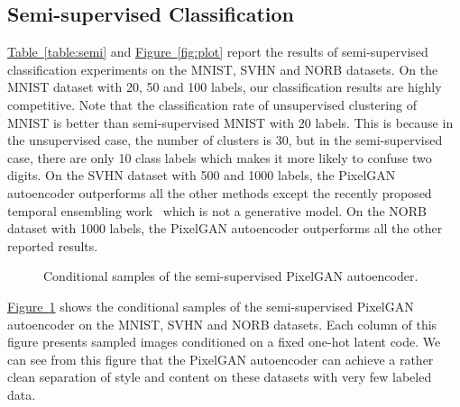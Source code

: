 \documentclass{article}
\newcommand{\mytable}[1]{\hyperref[table:#1]{Table~\ref*{table:#1}}}
\newcommand{\myfig}[1]{\hyperref[fig:#1]{Figure~\ref*{fig:#1}}}
\begin{document}
\subsection{Semi-supervised Classification}\label{sec:experiments:semi}
\mytable{semi} and \myfig{plot} report the results of semi-supervised classification experiments on the MNIST, SVHN and NORB datasets. On the MNIST dataset with 20, 50 and 100 labels, our classification results are highly competitive.
Note that the classification rate of unsupervised clustering of MNIST is better than semi-supervised MNIST with 20 labels. This is because in the unsupervised case, the number of clusters is 30, but in the semi-supervised case, there are only 10 class labels which makes it more likely to confuse two digits. 
On the SVHN dataset with 500 and 1000 labels, the PixelGAN autoencoder outperforms all the other methods except the recently proposed temporal ensembling work~\citep{temporal-ensembling} which is not a generative model.
On the NORB dataset with 1000 labels, the PixelGAN autoencoder outperforms all the other reported results.

\begin{figure}[b]
\centering
\hspace*{2.2cm}
\hspace*{2.2cm}
\hspace*{.7cm}
\vspace{-.3cm}
\caption{\label{fig:disentangle}Conditional samples of the semi-supervised PixelGAN autoencoder.}
\end{figure}


\myfig{disentangle} shows the conditional samples of the semi-supervised PixelGAN autoencoder on the MNIST, SVHN and NORB datasets. Each column of this figure presents sampled images conditioned on a fixed one-hot latent code. We can see from this figure that the PixelGAN autoencoder can achieve a rather clean separation of style and content on these datasets with very few labeled data.
\end{document}
